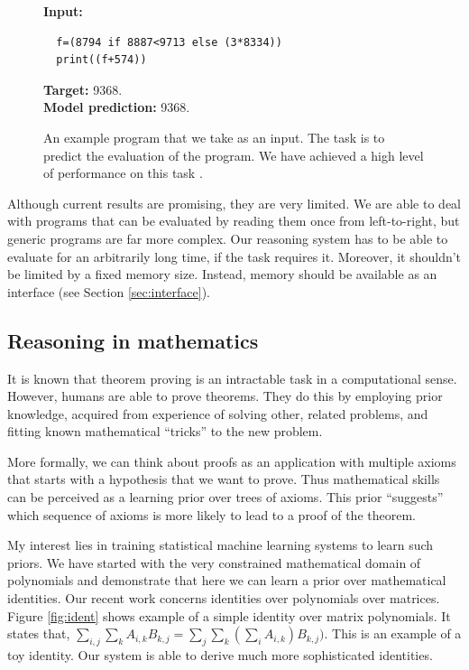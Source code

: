 \documentclass{article}
\begin{document}
\begin{figure}
  \begin{code}
  \begin{mdframed}
  {\bf Input:}
  \begin{lstlisting}
  f=(8794 if 8887<9713 else (3*8334))
  print((f+574))
  \end{lstlisting} 
  {\bf Target:} 9368. \\
  {\bf Model prediction:} 9368. 
  \end{mdframed}
  \end{code}
  \caption{An example program that we take as an input. The task is
    to predict the evaluation of the program. We have 
  achieved a high level of performance on this task \cite{zaremba2014execute}.}
  \label{fig:prog}
\end{figure}


Although current results are promising, they are very limited. We are able to deal with programs
that can be evaluated by reading them once from left-to-right, but
generic programs are far more complex. Our reasoning system has to be
able to evaluate for an arbitrarily long time, if the
task requires it. Moreover, it shouldn't be limited by a fixed memory
size. Instead, memory should be available
as an interface (see Section \ref{sec:interface}).


\subsection{Reasoning in mathematics}
It is known that theorem proving is an intractable task in a computational sense. 
However, humans are able to prove theorems. They do this by employing prior
knowledge, acquired from experience of solving other, related
problems, and fitting known mathematical ``tricks'' to the new problem.

More formally, we can think about proofs as an application with
multiple axioms that starts with a 
hypothesis that we want to prove. Thus mathematical skills can be perceived as 
a learning prior over trees of axioms. This prior ``suggests'' which sequence of axioms is more
likely to lead to a proof of the theorem. 


My interest lies in training statistical machine learning systems to learn such priors. 
We have started with the very constrained mathematical domain of
polynomials and demonstrate that here we can learn a prior over mathematical identities. 
Our recent work \cite{zaremba2014learning} concerns identities 
over polynomials over matrices. Figure \ref{fig:ident} shows example of a simple identity
over matrix polynomials. It states that, $\sum_{i,j} \sum_k A_{i, k}B_{k, j} = 
\sum_{j} \sum_k (\sum_i A_{i, k})B_{k, j})$. This is an example of a toy identity. Our system is able
to derive much more sophisticated identities.
\end{document}
